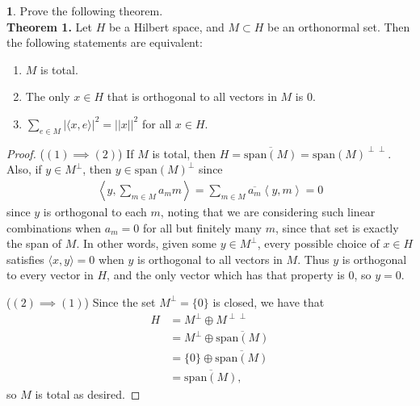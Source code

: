 \documentclass[12pt]{article}
\theoremstyle{definition}
\newtheorem{ex}{}
\begin{document}
\begin{ex}
	Prove the following theorem.
	\\
	\textbf{Theorem 1.} Let $H$ be a Hilbert space, and $M \subset H$ be an orthonormal set.
	Then the following statements are equivalent: \begin{enumerate}[label=(\arabic*)]
		\item $M$ is total.
		\item The only $x \in H$ that is orthogonal to all vectors in $M$ is 0.
		\item $\sum_{e \in M} |\langle x, e \rangle |^2 = ||x||^2$ for all $x \in H$.
	\end{enumerate}
\end{ex}
\begin{proof}
	($(1) \implies (2)$) If $M$ is total, then $H = \overline{\mathrm{span}(M)} = \mathrm{span}(M)^{\perp\perp}$.
	Also, if $y \in M^\perp$, then $y \in \mathrm{span}(M)^\perp$ since \begin{align*}
		\left\langle y, \sum_{m \in M} a_m m \right\rangle = \sum_{m \in M} \overline{a_m}\left\langle y, m  \right\rangle = 0
	\end{align*}
	since $y$ is orthogonal to each $m$, noting that we are considering such linear combinations when $a_m = 0$ for all but finitely many $m$, since that set is exactly the span of $M$.
	In other words, given some $y \in M^\perp$, every possible choice of $x \in H$ satisfies $\langle x, y \rangle = 0$ when $y$ is orthogonal to all vectors in $M$.
	Thus $y$ is orthogonal to every vector in $H$, and the only vector which has that property is 0, so $y = 0$.

	($(2) \implies (1)$) Since the set $M^\perp = \lbrace 0 \rbrace$ is closed, we have that \begin{align*}
		H & = M^\perp \oplus M^{\perp\perp}                        \\
		  & = M^\perp \oplus \overline{\mathrm{span}(M)}           \\
		  & = \lbrace 0 \rbrace \oplus \overline{\mathrm{span}(M)} \\
		  & = \overline{\mathrm{span}(M)},
	\end{align*}
	so $M$ is total as desired.


\end{proof}
\end{document}
